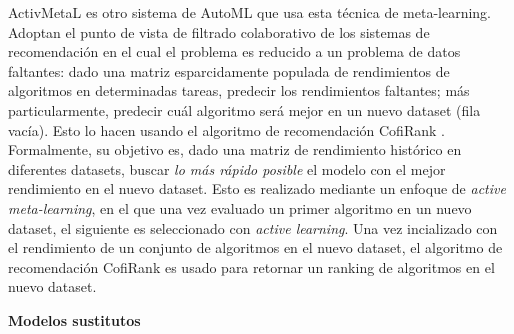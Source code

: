ActivMetaL \cite{activmetal} es otro sistema de AutoML que usa esta técnica de meta-learning. Adoptan el punto de vista de filtrado colaborativo de los sistemas de recomendación en el cual el problema es reducido a un problema de datos faltantes: dado una matriz esparcidamente populada de rendimientos de algoritmos en determinadas tareas, predecir los rendimientos faltantes; más particularmente, predecir cuál algoritmo será mejor en un nuevo dataset (fila vacía). Esto lo hacen usando el algoritmo de recomendación CofiRank \cite{weimar2007cofirank}. Formalmente, su objetivo es, dado una matriz de rendimiento histórico en diferentes datasets, buscar \textit{lo más rápido posible} el modelo con el mejor rendimiento en el nuevo dataset. Esto es realizado mediante un enfoque de \textit{active meta-learning}, en el que una vez evaluado un primer algoritmo en un nuevo dataset, el siguiente es seleccionado con \textit{active learning}. Una vez incializado con el rendimiento de un conjunto de algoritmos en el nuevo dataset, el algoritmo de recomendación CofiRank es usado para retornar un ranking de algoritmos en el nuevo dataset. %

\quad

\textbf{Modelos sustitutos}


